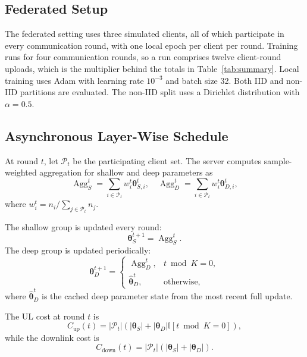 \documentclass[10pt,conference]{IEEEtran}
\begin{document}
\subsection{Federated Setup}

The federated setting uses three simulated clients, all of which participate in every communication round, with one local epoch per client per round. Training runs for four communication rounds, so a run comprises twelve client-round uploads, which is the multiplier behind the totals in Table~\ref{tab:summary}. Local training uses Adam with learning rate $10^{-3}$ and batch size 32. Both IID and non-IID partitions are evaluated. The non-IID split uses a Dirichlet distribution with $\alpha=0.5$.

\subsection{Asynchronous Layer-Wise Schedule}

At round $t$, let $\mathcal{P}_t$ be the participating client set. The server computes sample-weighted aggregation for shallow and deep parameters as
\begin{equation}
\operatorname{Agg}_S^t =
\sum_{i\in\mathcal{P}_t}w_i^t\boldsymbol{\theta}_{S,i}^t,
\quad
\operatorname{Agg}_D^t =
\sum_{i\in\mathcal{P}_t}w_i^t\boldsymbol{\theta}_{D,i}^t,
\end{equation}
where $w_i^t=n_i/\sum_{j\in\mathcal{P}_t}n_j$.

The shallow group is updated every round:
\begin{equation}
\boldsymbol{\theta}_S^{t+1}=\operatorname{Agg}_S^t.
\end{equation}
The deep group is updated periodically:
\begin{equation}
\boldsymbol{\theta}_D^{t+1}=
\begin{cases}
\operatorname{Agg}_D^t, & t \bmod K=0,\\
\widehat{\boldsymbol{\theta}}_D^t, & \text{otherwise},
\end{cases}
\end{equation}
where $\widehat{\boldsymbol{\theta}}_D^t$ is the cached deep parameter state from the most recent full update.

The UL cost at round $t$ is
\begin{equation}
C_{\text{up}}(t)=|\mathcal{P}_t|
\left(
|\boldsymbol{\theta}_S|
+
|\boldsymbol{\theta}_D|\mathbb{I}[t\bmod K=0]
\right),
\end{equation}
while the downlink cost is
\begin{equation}
C_{\text{down}}(t)=|\mathcal{P}_t|
\left(
|\boldsymbol{\theta}_S|+|\boldsymbol{\theta}_D|
\right).
\end{equation}
\end{document}
